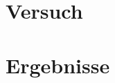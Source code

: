 \begin{quote}
\begin{quote}
        \end{quote}
    
    


        
    
  
\end{quote}


\section{Versuch}
\begin{quote}
    
\end{quote}


\section{Ergebnisse}
\begin{quote}
    
\end{quote}




%     
%         





